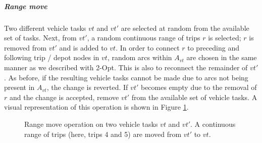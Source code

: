 \documentclass[]{article}
\begin{document}
\noindent\subparagraph{Range move} Two different vehicle tasks $vt$ and $vt'$ are selected at random from the available set of tasks. Next, from $vt'$, a random continuous range of trips $r$ is selected; $r$ is removed from $vt'$ and is added to $vt$. In order to connect $r$ to preceding and following trip / depot nodes in $vt$, random arcs within $A_{vt}$ are chosen in the same manner as we described with 2-Opt. This is also to reconnect the remainder of $vt'$. As before, if the resulting vehicle tasks cannot be made due to arcs not being present in $A_{vt}$, the change is reverted. If $vt'$ becomes empty due to the removal of $r$ and the change is accepted, remove $vt'$ from the available set of vehicle tasks. A visual representation of this operation is shown in Figure \ref{fig:rangemove-vt}.
\begin{figure}[H]
  \centering
  \caption{Range move operation on two vehicle tasks $vt$ and $vt'$. A continuous range of trips (here, trips 4 and 5) are moved from $vt'$ to $vt$.}
  \label{fig:rangemove-vt}
\end{figure}
\end{document}
